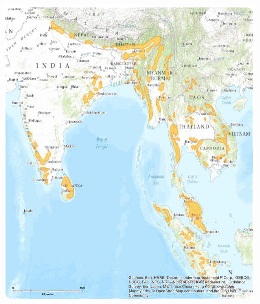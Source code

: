 \documentclass[10pt]{beamer}
\begin{document}
\begin{frame}[t]
\begin{columns}
		\begin{column}{0.5\textwidth}
			\begin{center}
				\includegraphics[width=1.0\textwidth]{figures/asia_range.png}
			\end{center}
		\end{column}
	\end{columns}

\end{frame} 
\end{document}
